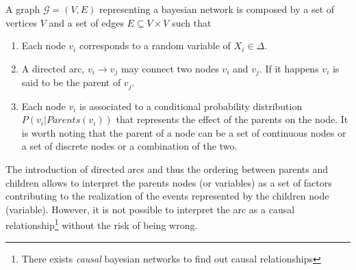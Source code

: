 \documentclass{article}
\begin{document}
A graph $\mathcal{G} = (V,E)$ representing a bayesian network is composed by a set of vertices $V$ and a set of edges $E \subseteq V \times V$ such that 
\begin{enumerate}
    \item Each node $v_i$ corresponds to a random variable of $X_i \in  \Delta$.
    \item A directed arc,  $v_i \rightarrow v_j$ may connect two nodes $v_i$ and $v_j$. If it happens $v_i$ is said to be the parent of $v_j$.
    \item Each node $v_i$ is associated to a conditional probability distribution \\
    $P(v_i  |Parents(v_i))$ that represents the effect of the parents on the node. It is worth noting that the parent of a node can be  a set of continuous nodes or a set of discrete nodes or a combination of the two.
\end{enumerate}
The introduction of directed arcs and thus the ordering between parents and children allows to interpret the parents nodes (or variables) as a set of factors contributing to the realization of the events represented by the children node (variable). However, it is not possible to interpret the arc as a causal relationship\footnote{There exists \textit{causal} bayesian networks to find out causal relationships} without the risk of being wrong.\\
\end{document}
